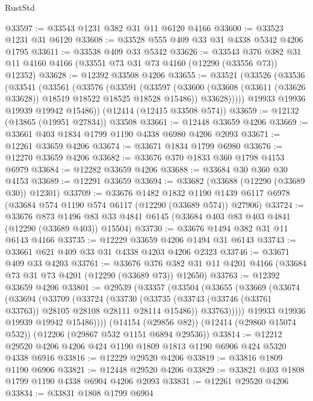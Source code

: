 \begin{lexlean}{RustStd}
\begin{coremodule}
@33597 := @33543 @1231 @382 @31 @11 @6120 @4166
@33600 := @33523 @1231 @31 @6120
@33608 := @33528 @555 @409 @33 @31 @4338 @5342 @4206 @1795
@33611 := @33538 @409 @33 @5342
@33626 := @33543
    @376
    @382
    @31
    @11
    @4160
    @4166
    (@33551 @73 @31 @73 @4160 (@12290 (@33556 @73)) @12352)
@33628 := @12392 @33508 @4206
@33655 := @33521
    (@33526
      (@33536
        (@33541
          (@33561
            (@33576
              (@33591
                (@33597
                  (@33600 (@33608 (@33611 (@33626 @33628)) @18519 @18522 @18525 @18528 @15486))
                  @33628)))))
        @19933
        @19936
        @19939
        @19942
        @15486))
    (@12414 (@12415 @33508 @574))
@33659 := @12132 (@13865 (@19951 @27834)) @33508
@33661 := @12448 @33659 @4206
@33669 := @33661 @403 @1834 @1799 @1190 @4338 @6980 @4206 @2093
@33671 := @12261 @33659 @4206
@33674 := @33671 @1834 @1799 @6980
@33676 := @12270 @33659 @4206
@33682 := @33676 @370 @1833 @360 @1798 @4153 @6979
@33684 := @12282 @33659 @4206
@33688 := @33684 @30 @360 @30 @4153
@33689 := @12291 @33659
@33694 := @33682 (@33688 (@12290 (@33689 @30)) @12301)
@33709 := @33676
    @1482
    @1832
    @1190
    @1439
    @6117
    @6978
    (@33684 @574 @1190 @574 @6117 (@12290 (@33689 @574)) @27906)
@33724 := @33676
    @873
    @1496
    @83
    @33
    @4841
    @6145
    (@33684 @403 @83 @403 @4841 (@12290 (@33689 @403)) @15504)
@33730 := @33676 @1494 @382 @31 @11 @6143 @4166
@33735 := @12229 @33659 @4206 @1494 @31 @6143
@33743 := @33661 @621 @409 @33 @31 @4338 @4203 @4206 @2323
@33746 := @33671 @409 @33 @4203
@33761 := @33676
    @376
    @382
    @31
    @11
    @4201
    @4166
    (@33684 @73 @31 @73 @4201 (@12290 (@33689 @73)) @12650)
@33763 := @12392 @33659 @4206
@33801 := @29539
    (@33357
      (@33504
        (@33655
          (@33669
            (@33674
              (@33694
                (@33709
                  (@33724
                    (@33730
                      (@33735 (@33743 (@33746 (@33761 @33763)) @28105 @28108 @28111 @28114 @15486))
                      @33763)))))
            @19933
            @19936
            @19939
            @19942
            @15486))))
    (@14154 (@29856 @82))
    (@12414 (@29860 @15074 @532))
    (@12206 (@29867 @532 @1151 @6894 @29536))
@33814 := @12212 @29520 @4206 @4206 @424 @1190 @1809 @1813 @1190 @6906 @424 @5320 @4338 @6916
@33816 := @12229 @29520 @4206
@33819 := @33816 @1809 @1190 @6906
@33821 := @12448 @29520 @4206
@33829 := @33821 @403 @1808 @1799 @1190 @4338 @6904 @4206 @2093
@33831 := @12261 @29520 @4206
@33834 := @33831 @1808 @1799 @6904

\end{coremodule}
\end{lexlean}
